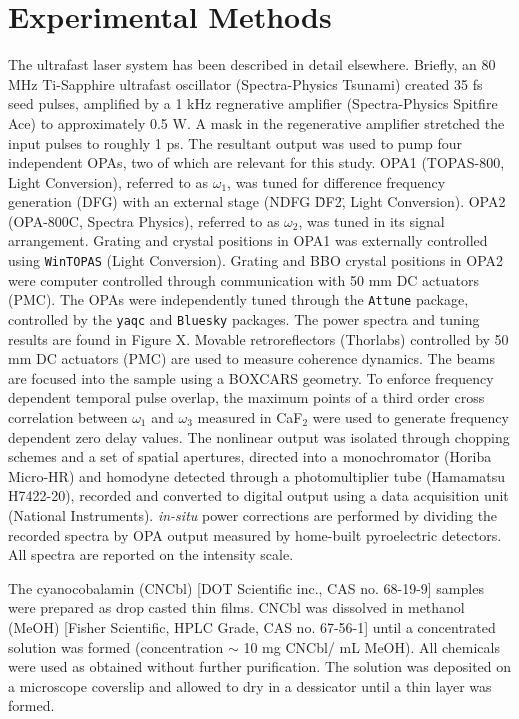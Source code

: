 \documentclass[aip, jcp, draft, onecolumn]{revtex4-2}
\begin{document}
\section{Experimental Methods}
The ultrafast laser system has been described in detail elsewhere. \cite{RN278, Kaufman2024}
Briefly, an 80 MHz Ti-Sapphire ultrafast oscillator (Spectra-Physics Tsunami) created 35 fs seed pulses, amplified by a 1 kHz regnerative amplifier (Spectra-Physics Spitfire Ace) to approximately 0.5 W.
A mask in the regenerative amplifier stretched the input pulses to roughly 1 ps.
The resultant output was used to pump four independent OPAs, two of which are relevant for this study.
OPA1 (TOPAS-800, Light Conversion), referred to as $\omega_1$, was tuned for difference frequency generation (DFG) with an external stage (NDFG \"DF2\", Light Conversion).
OPA2 (OPA-800C, Spectra Physics), referred to as $\omega_2$, was tuned in its signal arrangement. 
Grating and crystal positions in OPA1 was externally controlled using \texttt{WinTOPAS} (Light Conversion).
Grating and BBO crystal positions in OPA2 were computer controlled through communication with 50 mm DC actuators (PMC). %
The OPAs were independently tuned through the \texttt{Attune} package, controlled by the \texttt{yaqc} and \texttt{Bluesky} packages. \cite{RN414, RN386, SkyeOPA, KyleOPA}
The power spectra and tuning results are found in Figure X.%
Movable retroreflectors (Thorlabs) controlled by 50 mm DC actuators (PMC) are used to measure coherence dynamics.
The beams are focused into the sample using a BOXCARS geometry.\cite{RN308, Kaufman2024}
To enforce frequency dependent temporal pulse overlap, the maximum points of a third order cross correlation between $\omega_1$ and $\omega_3$ measured in CaF$_2$ were used to generate frequency dependent zero delay values.
The nonlinear output was isolated through chopping schemes and a set of spatial apertures, directed into a monochromator (Horiba Micro-HR) and homodyne detected through a photomultiplier tube (Hamamatsu H7422-20), recorded and converted to digital output using a data acquisition unit (National Instruments).
\textit{in-situ} power corrections are performed by dividing the recorded spectra by OPA output measured by home-built pyroelectric detectors.
All spectra are reported on the intensity scale. %

The cyanocobalamin (CNCbl) [DOT Scientific inc., CAS no. 68-19-9] samples were prepared as drop casted thin films.
CNCbl was dissolved in methanol (MeOH) [Fisher Scientific, HPLC Grade, CAS no. 67-56-1] until a concentrated solution was formed (concentration $\sim$ 10 mg CNCbl/ mL MeOH). 
All chemicals were used as obtained without further purification.
The solution was deposited on a microscope coverslip and allowed to dry in a dessicator until a thin layer was formed.
\end{document}
